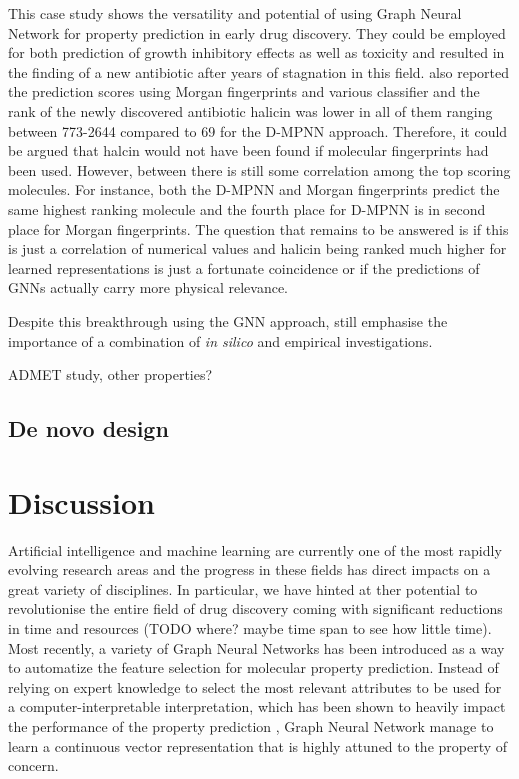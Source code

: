 This case study shows the versatility and potential of using Graph Neural Network for property prediction in early drug discovery. They could be employed for both prediction of growth inhibitory effects as well as toxicity and resulted in the finding of a new antibiotic after years of stagnation in this field. \cite{STOKES2020688} also reported the prediction scores using Morgan fingerprints and various classifier and the rank of the newly discovered antibiotic halicin was lower in all of them ranging between 773-2644 compared to 69 for the D-MPNN approach. Therefore, it could be argued that halcin would not have been found if molecular fingerprints had been used. However, between there is still some correlation among the top scoring molecules. For instance, both the D-MPNN and Morgan fingerprints predict the same highest ranking molecule and the fourth place for D-MPNN is in second place for Morgan fingerprints. The question that remains to be answered is if this is just a correlation of numerical values and halicin being ranked much higher for learned representations is just a fortunate coincidence or if the predictions of GNNs actually carry more physical relevance.

Despite this breakthrough using the GNN approach, \cite{STOKES2020688} still emphasise the importance of a combination of \emph{in silico} and empirical investigations. 


ADMET study, other properties?
\subsection{De novo design}

\section{Discussion}
Artificial intelligence and machine learning are currently one of the most rapidly evolving research areas and the progress in these fields has direct impacts on  a great variety of disciplines. In particular, we have hinted at ther potential to revolutionise the entire field of drug discovery coming with significant reductions in time and resources (TODO where? maybe time span to see how little time). Most recently, a variety of Graph Neural Networks has been introduced as a way to automatize the feature selection for molecular property prediction. Instead of relying on expert knowledge to select the most relevant attributes to be used for a computer-interpretable interpretation, which has been shown to heavily impact the performance of the property prediction \citep{tian}, Graph Neural Network manage to learn a continuous vector representation that is highly attuned to the property of concern. 

